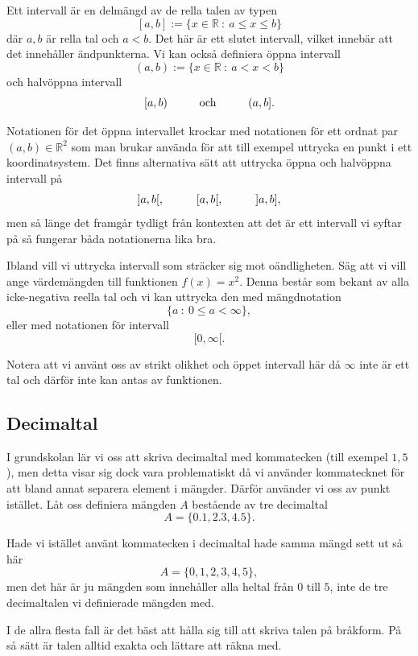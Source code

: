 \documentclass[titlepage]{article}
\begin{document}
Ett intervall är en delmängd av de rella talen av typen
$$[a,b] := \{x \in \mathbb{R}\: : \: a\leq x \leq b\}$$
där $a,b$ är rella tal och $a<b$. Det här är ett slutet intervall, vilket innebär att det innehåller ändpunkterna. Vi kan också definiera öppna intervall 
$$(a,b) := \{x \in \mathbb{R} \: : \: a<x<b\}$$
och halvöppna intervall
$$[a,b) \hspace{10mm} \text{och} \hspace{10mm}(a,b].$$

Notationen för det öppna intervallet krockar med notationen för ett ordnat par $(a,b) \in \mathbb{R}^2$ som man brukar använda för att till exempel uttrycka en punkt i ett koordinatsystem. Det finns alternativa sätt att uttrycka öppna och halvöppna intervall på
$$]a,b[, \hspace{10mm} [a,b[, \hspace{10mm} ]a,b],$$
men så länge det framgår tydligt från kontexten att det är ett intervall vi syftar på så fungerar båda notationerna lika bra.

Ibland vill vi uttrycka intervall som sträcker sig mot oändligheten. Säg att vi vill ange värdemängden till funktionen $f(x) = x^2$. Denna består som bekant av alla icke-negativa reella tal och vi kan uttrycka den med mängdnotation
$$\{ a \: : \: 0 \leq a < \infty \},$$
eller med notationen för intervall
$$[0, \infty[.$$

Notera att vi använt oss av strikt olikhet och öppet intervall här då $\infty$ inte är ett tal och därför inte kan antas av funktionen.




\subsection{Decimaltal}

I grundskolan lär vi oss att skriva decimaltal med kommatecken (till exempel $1,5$), men detta visar sig dock vara problematiskt då vi använder kommatecknet för att bland annat separera element i mängder. Därför använder vi oss av punkt istället. Låt oss definiera mängden $A$ bestående av tre decimaltal
$$A = \{0.1,2.3,4.5\}.$$

Hade vi istället använt kommatecken i decimaltal hade samma mängd sett ut så här
$$A = \{0,1,2,3,4,5\},$$
men det här är ju mängden som innehåller alla heltal från $0$ till $5$, inte de tre decimaltalen vi definierade mängden med.

I de allra flesta fall är det bäst att hålla sig till att skriva talen på bråkform. På så sätt är talen alltid exakta och lättare att räkna med.
\end{document}
